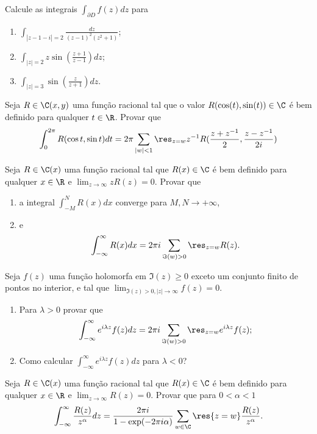 \begin{problema}
Calcule as integrais $\int_{\partial D} f(z) dz$ para
\begin{enumerate}
\item $\int_{|z-1-i|=2} \frac{dz}{(z-1)^2 (z^2+1)}$;
\item $\int_{|z|=2} z \sin(\frac{z+1}{z-1}) dz$;
\item $\int_{|z|=3} \sin(\frac{z}{z+1}) dz$.
\end{enumerate}
\end{problema}


\begin{problema}
Seja $R \in \C(x,y)$ uma função racional tal que o valor $R(\cos(t),\sin(t))\in\C$ é bem definido
para qualquer $t\in\R$. Provar que
\[ \int_0^{2\pi} R(\cos t,\sin t) dt 
 = 2\pi \sum_{|w|<1} \res_{z=w} z^{-1} R(\frac{z+z^{-1}}{2},\frac{z-z^{-1}}{2i}) \]
\end{problema}

\begin{problema}
Seja $R \in \C(x)$ uma função racional tal que $R(x)\in\C$ é bem definido para qualquer $x\in\R$
e $\lim_{z\to\infty} zR(z) = 0$. Provar que
\begin{enumerate}
\item a integral $\int_{-M}^N R(x) dx$
converge para $M,N\to+\infty$,
\item  e \[ \int_{-\infty}^\infty R(x) dx = 2\pi i \sum_{\Im(w)>0} \res_{z=w} R(z). \]
\end{enumerate}
\end{problema}

\begin{problema}
Seja $f(z)$ uma função holomorfa em $\Im(z)\geq 0$ exceto um conjunto finito de pontos no interior,
e tal que $\lim_{\Im(z)>0, |z|\to\infty} f(z) = 0$.
\begin{enumerate}
\item Para $\lambda>0$ provar que
\[ \int_{-\infty}^\infty e^{i\lambda z} f(z) dz = 2\pi i \sum_{\Im(w)>0} \res_{z=w} e^{i\lambda z} f(z); \]
\item Como calcular $\int_{-\infty}^\infty e^{i\lambda z} f(z) dz$ para $\lambda<0$?
\end{enumerate}
\end{problema}

\begin{problema}
Seja $R \in \C(x)$ uma função racional tal que $R(x)\in\C$ é bem definido para qualquer $x\in\R$
e $\lim_{z\to\infty} R(z) = 0$. Provar que para $0<\alpha<1$
\[ \int_{-\infty}^\infty \frac{R(z)}{z^\alpha} dz 
 = \frac{2\pi i}{1-\exp(-2\pi i\alpha)} \sum_{w\in\C} \res{z=w} \frac{R(z)}{z^\alpha}. \]
\end{problema}


